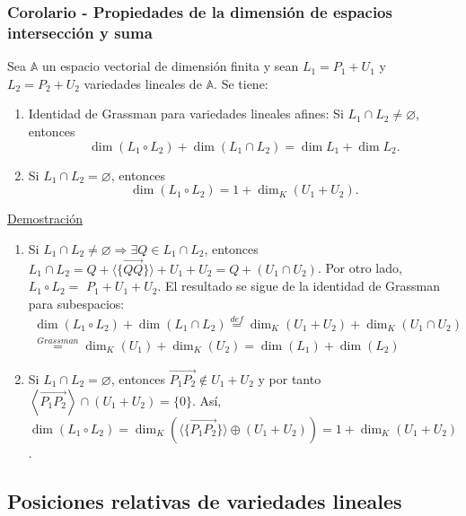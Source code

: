 \documentclass[12pt, a4paper, ones, notitlepage, openany,titlepage]{article}
\newcommand{\demostracion}{\noindent\underline{Demostración}}
\begin{document}
\subsubsection{Corolario - Propiedades de la dimensión de espacios intersección y suma}
Sea $\mathbb{A}$ un espacio vectorial de dimensión finita y sean $L_{1}=P_{1}+U_{1}$ y $L_{2}=P_{2}+U_{2}$ variedades lineales de $\mathbb{A}$. Se tiene:
\begin{enumerate}[label=(\arabic*)]
\item Identidad de Grassman para variedades lineales afines: Si $L_{1} \cap L_{2} \neq \varnothing$, entonces
$$
\dim \left(L_{1} \circ L_{2}\right)+\dim \left(L_{1} \cap L_{2}\right)=\dim  L_{1}+\dim  L_{2} .
$$

\item Si $L_{1} \cap L_{2}=\varnothing$, entonces
$$
\dim \left(L_{1} \circ L_{2}\right)=1+\dim _{K}\left(U_{1}+U_{2}\right) .
$$
\end{enumerate}
\demostracion
\begin{enumerate}[label=(\arabic*)]
\item Si $L_{1} \cap L_{2} \neq \varnothing \Longrightarrow \exists Q \in L_{1} \cap L_{2}$, entonces $L_{1} \cap L_{2} = Q + \langle \{\overrightarrow{QQ}\} \rangle + U_1 + U_2 = Q+\left(U_{1} \cap U_{2}\right)$. Por otro lado, $L_{1} \circ L_{2}=$ $P_{1}+U_{1}+U_{2}$. El resultado se sigue de la identidad de Grassman para subespacios:
\begin{gather*}
\dim  (L_1 \circ L_2) + \dim  (L_1 \cap L_2) \overset{def}{=} \dim _K (U_1 + U_2) + \dim _K (U_1 \cap U_2) \\ \overset{Grassman}{=} \dim _K (U_1) + \dim _K (U_2) = \dim  (L_1) + \dim  (L_2)
\end{gather*}

\item Si $L_{1} \cap L_{2}=\varnothing$, entonces $\overrightarrow{P_{1} P_{2}} \notin U_{1}+U_{2}$ y por tanto $\left\langle\overrightarrow{P_{1} P_{2}}\right\rangle \cap\left(U_{1}+U_{2}\right)=\{0\}$. Así, $\dim \left(L_{1} \circ L_{2}\right) = \dim _K \left(\langle\{\overrightarrow{P_1 P_2}\} \rangle \oplus (U_1 + U_2)\right) =1+\dim _{K}\left(U_{1}+U_{2}\right)$.
\end{enumerate}

\subsection{Posiciones relativas de variedades lineales}
\end{document}
